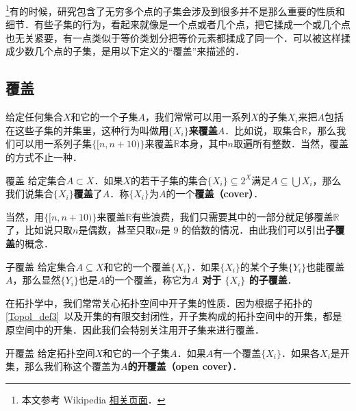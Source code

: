 

\footnote{本文参考 Wikipedia \href{https://en.wikipedia.org/wiki/Sequentially_compact_space}{相关页面}．}有的时候，研究包含了无穷多个点的子集会涉及到很多并不是那么重要的性质和细节．有些子集的行为，看起来就像是一个点或者几个点，把它揉成一个或几个点也无关紧要，有一点类似于等价类划分把等价元素都揉成了同一个．可以被这样揉成少数几个点的子集，是用以下定义的“覆盖”来描述的．

\subsection{覆盖}

给定任何集合$X$和它的一个子集$A$，我们常常可以用一系列$X$的子集$X_i$来把$A$包括在这些子集的并集里，这种行为叫做\textbf{用$\{X_i\}$来覆盖$A$}．比如说，取集合$\mathbb{R}$，那么我们可以用一系列子集$\{[n, n+10)\}$来覆盖$\mathbb{R}$本身，其中$n$取遍所有整数．当然，覆盖的方式不止一种．

\begin{definition}{覆盖}
给定集合$A\subset X$．如果$X$的若干子集的集合$\{X_i\}\subseteq 2^X$满足$A\subseteq\bigcup X_i$，那么我们说集合$\{X_i\}$\textbf{覆盖}了$A$．称$\{X_i\}$为$A$的一个\textbf{覆盖（cover）}．
\end{definition}

当然，用$\{[n, n+10)\}$来覆盖$\mathbb{R}$有些浪费，我们只需要其中的一部分就足够覆盖$\mathbb{R}$了，比如说只取$n$是偶数，甚至只取$n$是 $9$ 的倍数的情况．由此我们可以引出\textbf{子覆盖}的概念．

\begin{definition}{子覆盖}
给定集合$A\subseteq X$和它的一个覆盖$\{X_i\}$．如果$\{X_i\}$的某个子集$\{Y_i\}$也能覆盖$A$，那么显然$\{Y_i\}$也是$A$的一个覆盖，称它为\textbf{$A$ 对于 $\{X_i\}$ 的子覆盖}．
\end{definition}

在拓扑学中，我们常常关心拓扑空间中开子集的性质．因为根据子拓扑的\autoref{Topol_def3}~以及开集的有限交封闭性，开子集构成的拓扑空间中的开集，都是原空间中的开集．因此我们会特别关注用开子集来进行覆盖．

\begin{definition}{开覆盖}
给定拓扑空间$X$和它的一个子集$A$．如果$A$有一个覆盖$\{X_i\}$．如果各$X_i$是开集，那么我们称这个覆盖为\textbf{$A$的开覆盖（open cover）}．
\end{definition}

